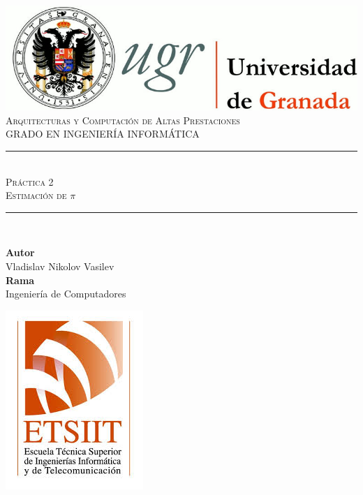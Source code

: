 \documentclass[11pt,a4paper]{article}
\newcommand{\asignatura}{Arquitecturas y Computación de Altas Prestaciones}
\newcommand{\autor}{Vladislav Nikolov Vasilev}
\newcommand{\titulo}{Práctica 2}
\newcommand{\subtitulo}{Estimación de $\pi$}
\newcommand{\rama}{Ingeniería de Computadores}
\begin{document}

\begin{titlepage}

\begin{minipage}{\textwidth}

\centering

\includegraphics[scale=0.3]{img/logo_ugr.jpg}\\[1cm]

\textsc{\Large \asignatura{}\\[0.2cm]}
\textsc{GRADO EN INGENIERÍA INFORMÁTICA}\\[1cm]

\noindent\rule[-1ex]{\textwidth}{1pt}\\[1.5ex]
\textsc{{\Huge \titulo\\[0.5ex]}}
\textsc{{\Large \subtitulo\\}}
\noindent\rule[-1ex]{\textwidth}{2pt}\\[3.5ex]

\end{minipage}

\vspace{0.7cm}

\begin{minipage}{\textwidth}

\centering

\textbf{Autor}\\ {\autor{}}\\[2.5ex]
\textbf{Rama}\\ {\rama}\\[2.5ex]
\vspace{0.3cm}

\includegraphics[scale=0.3]{img/etsiit.jpeg}


\end{minipage}
\end{titlepage}
\end{document}
